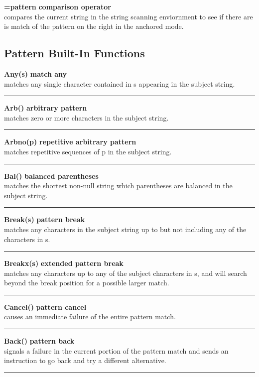 \documentclass{article}
\begin{document}
\noindent\textbf{=pattern} \hfill\textbf{comparison operator}\\
compares the current string in the string scanning enviornment to see if there are is match of the pattern on the right in the anchored mode.\\

\subsection{Pattern Built-In Functions}
\noindent\textbf{Any(s)} \hfill\textbf{match any}\\
matches any single character contained in s appearing in the subject string.\\
\noindent\rule{12cm}{0.1pt}

\noindent\textbf{Arb()} \hfill\textbf{arbitrary pattern}\\
matches zero or more characters in the subject string.\\
\noindent\rule{12cm}{0.1pt}

\noindent\textbf{Arbno(p)} \hfill\textbf{repetitive arbitrary pattern}\\
matches repetitive sequences of p in the subject string.\\
\noindent\rule{12cm}{0.1pt}

\noindent\textbf{Bal()} \hfill\textbf{balanced parentheses}\\
matches the shortest non-null string which parentheses are balanced in the subject string.\\
\noindent\rule{12cm}{0.1pt}

\noindent\textbf{Break(s)} \hfill\textbf{pattern break}\\
matches any characters in the subject string up to but not including any of the characters in s.\\
\noindent\rule{12cm}{0.1pt}

\noindent\textbf{Breakx(s)} \hfill\textbf{extended pattern break}\\
matches any characters up to any of the subject characters in s, and will search beyond the break position for a possible larger match.\\
\noindent\rule{12cm}{0.1pt}

\noindent\textbf{Cancel()} \hfill\textbf{pattern cancel}\\
causes an immediate failure of the entire pattern match.\\
\noindent\rule{12cm}{0.1pt}

\noindent\textbf{Back()} \hfill\textbf{pattern back}\\
signals a failure in the current portion of the pattern match and sends an instruction to go back and try a different alternative.\\
\noindent\rule{12cm}{0.1pt}
\end{document}
